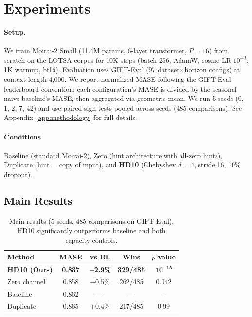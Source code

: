 \documentclass{article}
\begin{document}
\section{Experiments}

\paragraph{Setup.} We train Moirai-2 Small \citep{liu2024moirai2} (11.4M params, 6-layer transformer, $P{=}16$) from scratch on the LOTSA corpus \citep{woo2024unified} for 10K steps (batch 256, AdamW, cosine LR $10^{-3}$, 1K warmup, bf16). Evaluation uses GIFT-Eval \citep{vijay2024gifteval} (97 dataset$\times$horizon configs) at context length 4,000. We report normalized MASE following the GIFT-Eval leaderboard convention: each configuration's MASE is divided by the seasonal naive baseline's MASE, then aggregated via geometric mean. We run 5 seeds (0, 1, 2, 7, 42) and use paired sign tests pooled across seeds (485 comparisons). See Appendix~\ref{app:methodology} for full details.

\paragraph{Conditions.} Baseline (standard Moirai-2), Zero (hint architecture with all-zero hints), Duplicate (hint = copy of input), and \textbf{HD10} (Chebyshev $d{=}4$, stride 16, 10\% dropout).

\subsection{Main Results}

\begin{table}[t]
\caption{Main results (5 seeds, 485 comparisons on GIFT-Eval). HD10 significantly outperforms baseline and both capacity controls.}
\label{tab:main}
\vskip 0.1in
\centering
\begin{small}
\begin{tabular}{lcccc}
\toprule
\textbf{Method} & \textbf{MASE} & \textbf{vs BL} & \textbf{Wins} & \textbf{$p$-value} \\
\midrule
\textbf{HD10 (Ours)} & \textbf{0.837} & \textbf{$-$2.9\%} & \textbf{329/485} & $\mathbf{10^{-15}}$ \\
Zero channel & 0.858 & $-$0.5\% & 262/485 & 0.042 \\
Baseline & 0.862 & --- & --- & --- \\
Duplicate & 0.865 & $+$0.4\% & 217/485 & 0.99 \\
\bottomrule
\end{tabular}
\end{small}
\vskip -0.1in
\end{table}
\end{document}
